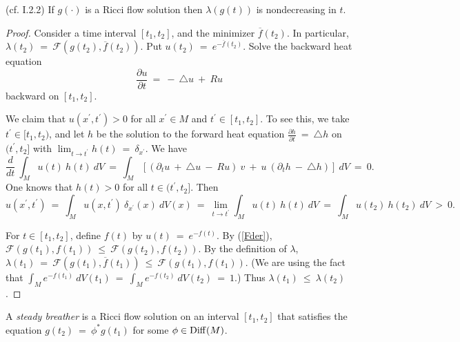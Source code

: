 \begin{proposition}
  \label{prop:kl-invariant-its-applications-monotonicity-entropy}
 (cf. I.2.2) \label{mono}
If $g(\cdot)$ is a Ricci flow solution then $\lambda(g(t))$ is
nondecreasing in $t$.
\end{proposition}
\begin{proof}
Consider a time
interval $[t_1, t_2]$, and the minimizer $\overline{f}(t_2)$. In
particular, $\lambda(t_2) \: = \: {\mathcal F}(g(t_2),
\overline{f}(t_2))$. Put $u(t_2) \: = \: e^{-\overline{f}(t_2)}$. Solve the
backward heat equation
\begin{equation}
\frac{\partial u}{\partial t} \: = \: - \: \triangle u \: + \: Ru
\end{equation}
backward on $[t_1, t_2]$.

We claim that
$u(x^\prime,t^\prime) > 0$
for all $x^\prime \in M$ and $t^\prime \in [t_1, t_2]$. To see this,
we take $t^\prime \in [t_1, t_2)$,
and let $h$ be the solution to the forward heat equation
$\frac{\partial h}{\partial t} \: = \: \triangle h$ on $(t^\prime, t_2]$
with $\lim_{t \rightarrow t^\prime} h(t) \: = \: \delta_{x^\prime}$.
We have
\begin{equation}
\frac{d}{dt} \: \int_M u(t) \: h(t) \: dV \: = \:
\int_M \left[ (\partial_t u \: + \: \triangle u \: - \: Ru) \: v \: + \: u \:
(\partial_t h \: - \: \triangle h) \right] \: dV \: = \: 0.
\end{equation}
One knows that $h(t) > 0$ for all $t \in (t^\prime, t_2]$. Then
\begin{equation}
u(x^\prime, t^\prime) \: = \: \int_M u(x, t^\prime) \:\delta_{x^\prime}(x) \:
dV(x) \: = \: \lim_{t \rightarrow t^\prime}
\int_M u(t) \: h(t) \:
dV \: = \:
\int_M u(t_2) \: h(t_2) \: dV \: > \: 0.
\end{equation}

For $t \in [t_1, t_2]$, define $f(t)$ by $u(t) \: = \: e^{-f(t)}$.
By (\ref{Fder}),
$
{\mathcal F}(g(t_1), f(t_1)) \: \le \:
{\mathcal F}(g(t_2), f(t_2))$. By the definition of
$\lambda$, $\lambda(t_1) \: = \: {\mathcal F}(g(t_1), \overline{f}(t_1))
\: \le \: {\mathcal F}(g(t_1), f(t_1))$. (We are using the fact that
$\int_M e^{-f(t_1)} \: dV(t_1) \: = \:
\int_M e^{-f(t_2)} \: dV(t_2) \: = \: 1$.)
Thus $\lambda(t_1) \: \le \: \lambda(t_2)$.
\end{proof}

\begin{definition}
  \label{def:kl-invariant-its-applications-steady-breather-definition}

A {\em steady breather} is a Ricci flow solution on an interval
$[t_1, t_2]$ that satisfies the equation
$g(t_2) \: = \: \phi^* g(t_1)$ for some $\phi \in \operatorname{Diff}(M)$.
\end{definition}

